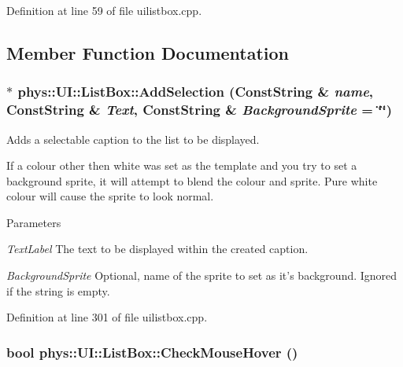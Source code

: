 Definition at line 59 of file uilistbox.cpp.



\subsection{Member Function Documentation}
\hypertarget{classphys_1_1UI_1_1ListBox_aa6069fc3690e09142033886d9d7b0b3a}{
\subsubsection[{AddSelection}]{ $\ast$ phys::UI::ListBox::AddSelection ({\bf ConstString} \& {\em name}, \/  {\bf ConstString} \& {\em Text}, \/  {\bf ConstString} \& {\em BackgroundSprite} = {\ttfamily \char`\"{}\char`\"{}})}}
\label{d0/d28/classphys_1_1UI_1_1ListBox_aa6069fc3690e09142033886d9d7b0b3a}


Adds a selectable caption to the list to be displayed. 

If a colour other then white was set as the template and you try to set a background sprite, it will attempt to blend the colour and sprite. Pure white colour will cause the sprite to look normal. 
\begin{DoxyParams}{Parameters}
\item[{\em TextLabel}]The text to be displayed within the created caption. \item[{\em BackgroundSprite}]Optional, name of the sprite to set as it's background. Ignored if the string is empty. \end{DoxyParams}


Definition at line 301 of file uilistbox.cpp.

\hypertarget{classphys_1_1UI_1_1ListBox_a789faeb98d98bb4d4d89cae8c53d4bc0}{
\subsubsection[{CheckMouseHover}]{\setlength{\rightskip}{0pt plus 5cm}bool phys::UI::ListBox::CheckMouseHover ()}}
\label{d0/d28/classphys_1_1UI_1_1ListBox_a789faeb98d98bb4d4d89cae8c53d4bc0}


